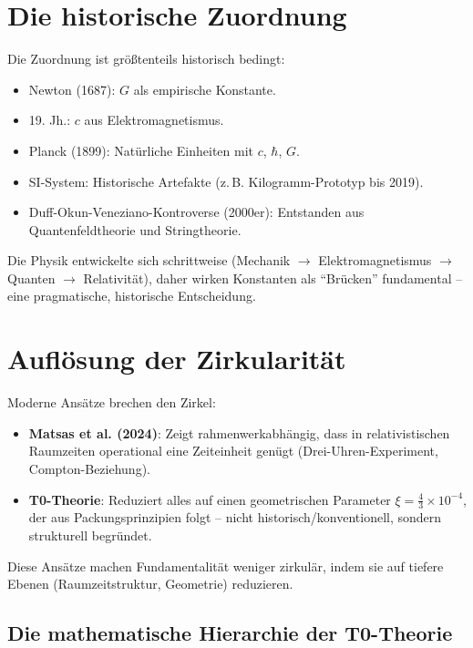 	\section{Die historische Zuordnung}
	
	Die Zuordnung ist größtenteils historisch bedingt:
	
	\begin{itemize}
		\item Newton (1687): $G$ als empirische Konstante.
		\item 19. Jh.: $c$ aus Elektromagnetismus.
		\item Planck (1899): Natürliche Einheiten mit $c$, $\hbar$, $G$.
		\item SI-System: Historische Artefakte (z.\,B. Kilogramm-Prototyp bis 2019).
		\item Duff-Okun-Veneziano-Kontroverse (2000er): Entstanden aus Quantenfeldtheorie und Stringtheorie.
	\end{itemize}
	
	Die Physik entwickelte sich schrittweise (Mechanik $\to$ Elektromagnetismus $\to$ Quanten $\to$ Relativität), daher wirken Konstanten als ``Brücken'' fundamental – eine pragmatische, historische Entscheidung.
	
	\section{Auflösung der Zirkularität}
	
	Moderne Ansätze brechen den Zirkel:
	
	\begin{itemize}
		\item \textbf{Matsas et al. (2024)}: Zeigt rahmenwerkabhängig, dass in relativistischen Raumzeiten operational eine Zeiteinheit genügt (Drei-Uhren-Experiment, Compton-Beziehung).
		\item \textbf{T0-Theorie}: Reduziert alles auf einen geometrischen Parameter $\xi = \frac{4}{3} \times 10^{-4}$, der aus Packungsprinzipien folgt – nicht historisch/konventionell, sondern strukturell begründet.
	\end{itemize}
	
	Diese Ansätze machen Fundamentalität weniger zirkulär, indem sie auf tiefere Ebenen (Raumzeitstruktur, Geometrie) reduzieren.
	
	\subsection{Die mathematische Hierarchie der T0-Theorie}
	
